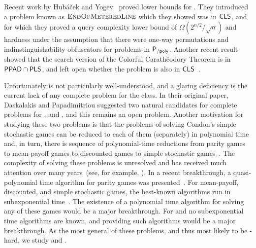 
Recent work by Hub\'{a}\v{c}ek and Yogev~\cite{hubavcek2017hardness} proved 
lower bounds for \CLS. They introduced
a problem known as $\textsc{EndOfMeteredLine}$ which they showed was in $\mathsf{CLS}$, and for which they
proved a query complexity lower bound of $\Omega(2^{n/2}/\sqrt{n})$ and
hardness under the assumption that there were one-way permutations and
indinstinguishability obfuscators for problems in $\mathsf{P_{/poly}}$.
%
Another recent result showed that the search version of the Colorful
Carath\'eodory Theorem is in $\mathsf{PPAD} \cap \mathsf{PLS}$, and left open
whether the problem is also in $\mathsf{CLS}$~\cite{colorfulcara2017}.

Unfortunately \CLS is not particularly well-understood, and a glaring
deficiency is the current lack of any complete problem for the class. In their
original paper, Daskalakis and Papadimitriou suggested two natural candidates
for complete problems for \CLS, \ContractionMap and \PLCP, and this remains an
open problem.
Another motivation for studying these two problems is that the problems of
solving Condon's simple stochastic games can be reduced to each of them
(separately) in polynomial time
and, in turn, there is sequence of polynomial-time reductions from parity games 
to mean-payoff games to discounted games to simple stochastic 
games~\cite{puri1996theory,gartner2005simple,jurdzinski2008simple,zwick1996complexity,hansen2013complexity}.
The complexity of solving these problems is unresolved and has received 
much attention over many years~(see, for example, 
\cite{zwick1996complexity,condon1992complexity,fearnley2010linear,jurdzinski1998deciding,bjorklund2004combinatorial,fearnley2016complexity}).
In a recent breakthrough, a quasi-polynomial time algorithm for parity games
was presented~\cite{parity}.
For mean-payoff, discounted, and simple stochastic games, the best-known 
algorithms run in subexponential time~\cite{ludwig1995subexponential}.
The existence of a polynomial time algorithm for solving any of these games
would be a major breakthrough.
For \ContractionMap and \PLCP no subexponential time algorithms 
are known, and providing such algorithms would be a major breakthrough.
As the most general of these problems, and thus most likely to be 
\CLS-hard, we study \ContractionMap and \PLCP.

